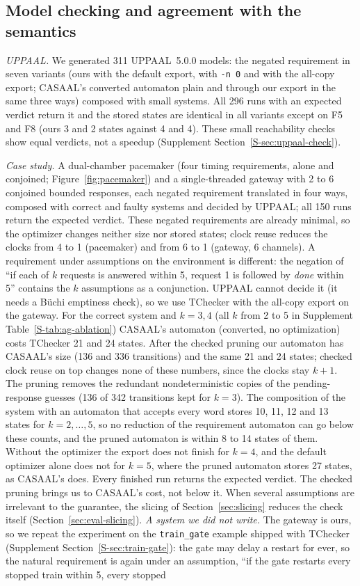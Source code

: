 \subsection{Model checking and agreement with the semantics}
\label{sec:verification-adds}
\emph{UPPAAL.} We generated 311 UPPAAL~5.0.0 models: the negated requirement in seven variants (ours with the default export, with \texttt{-n 0} and with the all-copy export; CASAAL's converted automaton plain and through our export in the same three ways) composed with small systems. All 296 runs with an expected verdict return it and the stored states are identical in all variants except on F5 and F8 (ours 3 and 2 states against 4 and 4). These small reachability checks show equal verdicts, not a speedup (Supplement Section~\ref{S-sec:uppaal-check}).

\emph{Case study.} A dual-chamber pacemaker (four timing requirements, alone and conjoined; Figure~\ref{fig:pacemaker}) and a single-threaded gateway with 2 to 6 conjoined bounded responses, each negated requirement translated in four ways, composed with correct and faulty systems and decided by UPPAAL; all 150 runs return the expected verdict. These negated requirements are already minimal, so the optimizer changes neither size nor stored states; clock reuse reduces the clocks from 4 to 1 (pacemaker) and from 6 to 1 (gateway, 6 channels). A requirement under assumptions on the environment is different: the negation of ``if each of $k$ requests is answered within 5, request 1 is followed by \emph{done} within 5'' contains the $k$ assumptions as a conjunction. UPPAAL cannot decide it (it needs a B\"uchi emptiness check), so we use TChecker with the all-copy export on the gateway. For the correct system and $k=3,4$ (all $k$ from 2 to 5 in Supplement Table~\ref{S-tab:ag-ablation}) CASAAL's automaton (converted, no optimization) costs TChecker 21 and 24 states. After the checked pruning our automaton has CASAAL's size (136 and 336 transitions) and the same 21 and 24 states; checked clock reuse on top changes none of these numbers, since the clocks stay $k+1$. The pruning removes the redundant nondeterministic copies of the pending-response guesses (136 of 342 transitions kept for $k=3$). The composition of the system with an automaton that accepts every word stores 10, 11, 12 and 13 states for $k=2,\dots,5$, so no reduction of the requirement automaton can go below these counts, and the pruned automaton is within 8 to 14 states of them. Without the optimizer the export does not finish for $k=4$, and the default optimizer alone does not for $k=5$, where the pruned automaton stores 27 states, as CASAAL's does. Every finished run returns the expected verdict. The checked pruning brings us to CASAAL's cost, not below it. When several assumptions are irrelevant to the guarantee, the slicing of Section~\ref{sec:slicing} reduces the check itself (Section~\ref{sec:eval-slicing}). \emph{A system we did not write.} The gateway is ours, so we repeat the experiment on the \texttt{train\_gate} example shipped with TChecker (Supplement Section~\ref{S-sec:train-gate}): the gate may delay a restart for ever, so the natural requirement is again under an assumption, ``if the gate restarts every stopped train within 5, every stopped 